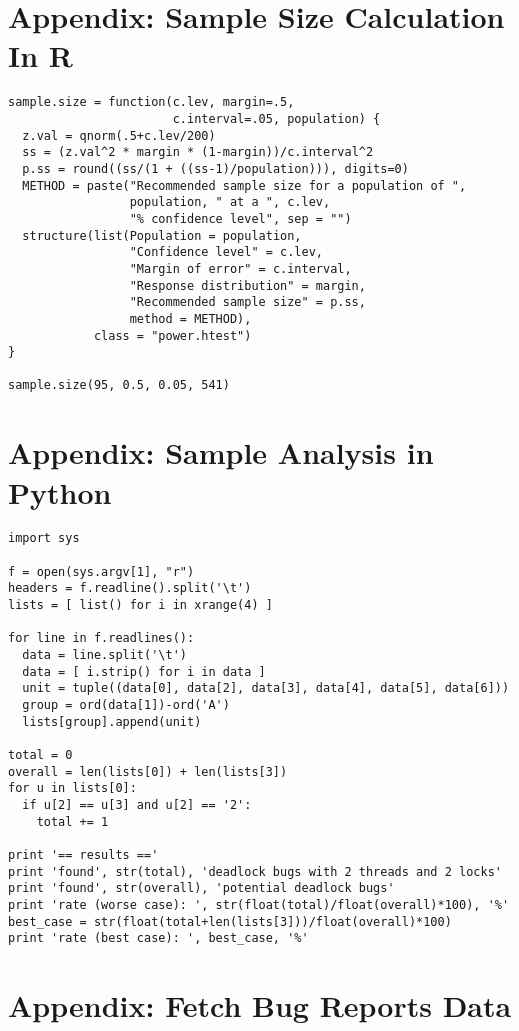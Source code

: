 
\section*{Appendix: Sample Size Calculation In R}

\noindent
\begin{verbatim}
sample.size = function(c.lev, margin=.5,
                       c.interval=.05, population) {
  z.val = qnorm(.5+c.lev/200)
  ss = (z.val^2 * margin * (1-margin))/c.interval^2
  p.ss = round((ss/(1 + ((ss-1)/population))), digits=0)
  METHOD = paste("Recommended sample size for a population of ",
                 population, " at a ", c.lev,
                 "% confidence level", sep = "")
  structure(list(Population = population,
                 "Confidence level" = c.lev,
                 "Margin of error" = c.interval,
                 "Response distribution" = margin,
                 "Recommended sample size" = p.ss,
                 method = METHOD),
            class = "power.htest")
}

sample.size(95, 0.5, 0.05, 541)
\end{verbatim}

\section*{Appendix: Sample Analysis in Python}

\noindent
\begin{verbatim}
import sys

f = open(sys.argv[1], "r")
headers = f.readline().split('\t')
lists = [ list() for i in xrange(4) ]

for line in f.readlines():
  data = line.split('\t')
  data = [ i.strip() for i in data ]
  unit = tuple((data[0], data[2], data[3], data[4], data[5], data[6]))
  group = ord(data[1])-ord('A')
  lists[group].append(unit)

total = 0
overall = len(lists[0]) + len(lists[3])
for u in lists[0]:
  if u[2] == u[3] and u[2] == '2':
    total += 1

print '== results =='
print 'found', str(total), 'deadlock bugs with 2 threads and 2 locks'
print 'found', str(overall), 'potential deadlock bugs'
print 'rate (worse case): ', str(float(total)/float(overall)*100), '%'
best_case = str(float(total+len(lists[3]))/float(overall)*100)
print 'rate (best case): ', best_case, '%'
\end{verbatim}


\section*{Appendix: Fetch Bug Reports Data}

